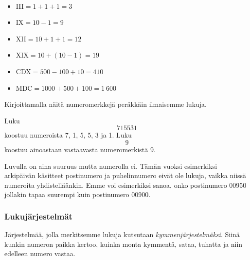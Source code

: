 \begin{esimerkki}
\ %
\begin{itemize} %
\item III$=1+1+1=3$
\item IX$=10-1=9$
\item XII$=10+1+1=12$
\item XIX$=10+(10-1)=19$
\item CDX$=500-100+10=410$
\item MDC$=1 000+500+100=1~600$
\end{itemize}
\end{esimerkki}


Kirjoittamalla näitä numeromerkkejä peräkkäin ilmaisemme lukuja.


\begin{esimerkki}
Luku \[715531\] koostuu numeroista 7, 1, 5, 5, 3 ja 1.
Luku \[9\] koostuu ainoastaan vastaavasta numeromerkistä 9.
\end{esimerkki}

Luvulla on aina suuruus mutta numerolla ei. Tämän vuoksi esimerkiksi arkipäivän käsitteet postinumero ja puhelinnumero eivät ole lukuja, vaikka niissä numeroita yhdistelläänkin. Emme voi esimerkiksi sanoa, onko postinumero 00950 jollakin tapaa suurempi kuin postinumero 00900.

\subsubsection*{Lukujärjestelmät}

Järjestelmää, jolla merkitsemme lukuja kutsutaan \emph{kymmenjärjestelmäksi}. Siinä kunkin numeron paikka kertoo, kuinka monta kymmentä, sataa, tuhatta ja niin edelleen numero vastaa.

